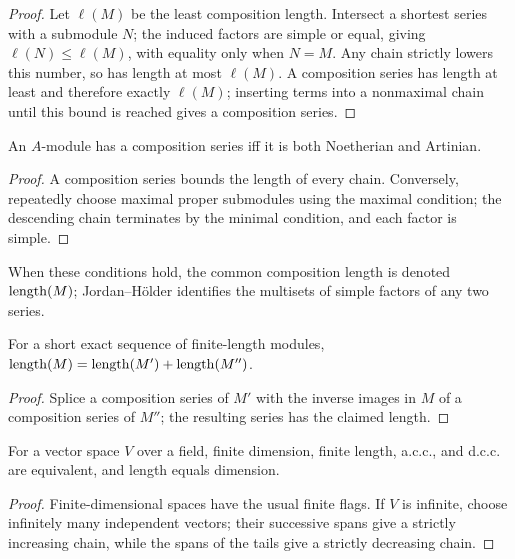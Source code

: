 \begin{proof}
Let $\ell(M)$ be the least composition length.  Intersect a shortest series with
a submodule $N$; the induced factors are simple or equal, giving
$\ell(N)\le\ell(M)$, with equality only when $N=M$.  Any chain strictly lowers
this number, so has length at most $\ell(M)$.  A composition series has length
at least and therefore exactly $\ell(M)$; inserting terms into a nonmaximal
chain until this bound is reached gives a composition series.
\end{proof}
\begin{proposition}
\label{am-prop-6-8}
\uses{}
An $A$-module has a composition series iff it is both Noetherian and Artinian.
\end{proposition}
\begin{proof}
A composition series bounds the length of every chain.  Conversely, repeatedly
choose maximal proper submodules using the maximal condition; the descending
chain terminates by the minimal condition, and each factor is simple.
\end{proof}
\begin{definition}
\label{am-def-finite-length}
\uses{}
When these conditions hold, the common composition length is denoted $\operatorname{length}(M)$;
Jordan--Hölder identifies the multisets of simple factors of any two series.
\end{definition}
\begin{proposition}
\label{am-prop-6-9}
\uses{}
For a short exact sequence of finite-length modules,
$\operatorname{length}(M)=\operatorname{length}(M')+\operatorname{length}(M'')$.
\end{proposition}
\begin{proof}
Splice a composition series of $M'$ with the inverse images in $M$ of a
composition series of $M''$; the resulting series has the claimed length.
\end{proof}
\begin{proposition}
\label{am-prop-6-10}
\uses{}
For a vector space $V$ over a field, finite dimension, finite length, a.c.c.,
and d.c.c. are equivalent, and length equals dimension.
\end{proposition}
\begin{proof}
Finite-dimensional spaces have the usual finite flags.  If $V$ is infinite,
choose infinitely many independent vectors; their successive spans give a
strictly increasing chain, while the spans of the tails give a strictly
decreasing chain.
\end{proof}
